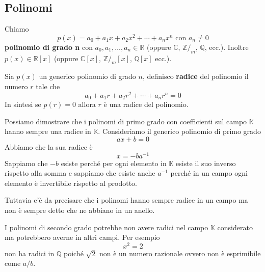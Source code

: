 \subsection{Polinomi}

\begin{defn}
	Chiamo
	\begin{equation*}
		p(x) = a_0 + a_1x + a_2x^2 + \cdots + a_n x^n \text{ con $a_n \neq 0$}
	\end{equation*}
	\textbf{polinomio di grado n} con $a_0, a_1, \dots, a_n \in \mathbb{R}$
	(oppure $\mathbb{C}$, $\mathbb{Z}/_m$, $\mathbb{Q}$, ecc.). Inoltre $p(x) \in \mathbb{R}[x]$
	(oppure $\mathbb{C}[x]$, $\mathbb{Z}/_m [x]$, $\mathbb{Q}[x]$ ecc.).
\end{defn}

\begin{defn}
	Sia $p(x)$ un generico polinomio di grado $n$, definisco \textbf{radice} del polinomio
	il numero $r$ tale che
	\begin{equation*}
		a_0 + a_1 r + a_2 r^2 + \cdots + a_n r^n = 0
	\end{equation*}
	In sintesi se $p(r) = 0$ allora $r$ \`e una radice del polinomio.
\end{defn}

\begin{observation}
	Possiamo dimostrare che i polinomi di primo grado con coefficienti sul campo $\mathbb{K}$
	hanno sempre una radice in $\mathbb{K}$. Consideriamo il generico polinomio di primo grado
	\begin{equation*}
		ax + b = 0
	\end{equation*}
	Abbiamo che la sua radice \`e
	\begin{equation*}
		x = -b a^{-1}
	\end{equation*}
	Sappiamo che $-b$ esiste perch\'e per ogni elemento in $\mathbb{K}$ esiste il suo inverso
	rispetto alla somma e sappiamo che esiste anche $a^{-1}$ perch\'e in un campo ogni elemento
	\`e invertibile rispetto al prodotto.

	Tuttavia c'\`e da precisare che i polinomi hanno sempre radice in un campo ma non \`e
	sempre detto che ne abbiano in un anello.
\end{observation}

\begin{observation}
	I polinomi di secondo grado potrebbe non avere radici nel campo $\mathbb{K}$ considerato
	ma potrebbero averne in altri campi.
	Per esempio
	\begin{equation*}
		x^2 = 2
	\end{equation*}
	non ha radici in $\mathbb{Q}$ poich\'e $\sqrt{2}$ non \`e un numero razionale ovvero non
	\`e esprimibile come $a / b$.
\end{observation}

